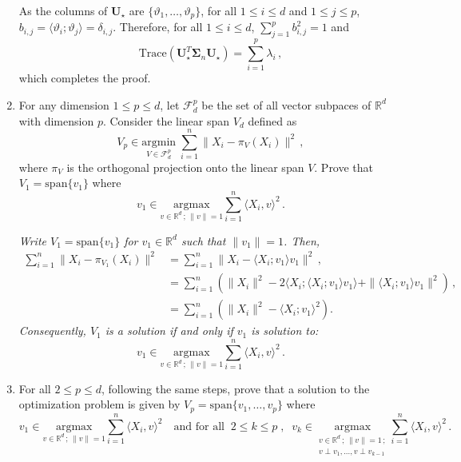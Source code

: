\documentclass[a4paper,10pt,fleqn]{article}
\newcommand{\eqsp}{\,}
\newcommand{\calF}{\mathcal{F}}
\newcommand{\rset}{\ensuremath{\mathbb{R}}}
\newcommand{\1}{\ensuremath{\mathbbm{1}}}
\newcommand{\bfU}{\mathbf{U}}
\newcommand{\bfs}{\mathbf{\Sigma}}
\begin{document}
\begin{enumerate}
{As the columns of $\bfU_{\star}$ are $\{\vartheta_1,\ldots,\vartheta_p\}$, for all $1\leqslant i\leqslant d$ and $1\leqslant j \leqslant p$, $b_{i,j} = \langle \vartheta_i;\vartheta_j\rangle = \delta_{i,j}$. Therefore,  for all $1\leqslant i\leqslant d$, $\sum_{j=1}^p b^2_{i,j} = 1$ and
$$
\mathrm{Trace}(\bfU^T_{\star}\bfs_n \bfU_{\star}) =\sum_{i = 1}^p \lambda_i\eqsp,
$$
which completes the proof.
}
\item  For any dimension $1\leqslant p \leqslant  d$, let $\calF_d^p$ be the set of all vector subpaces of $\rset^d$ with dimension $p$. Consider the linear span $V_d$ defined as
$$
V_p \in \underset{V\in \calF_d^p}{\mathrm{argmin}} \;\sum_{i=1}^n\|X_i - \pi_V(X_i)\|^2\eqsp,
$$
where $\pi_V$ is the orthogonal projection onto the linear span $V$. Prove that $V_1 = \mathrm{span}\{v_1\}$ where
$$
v_1 \in \underset{v \in \rset^d\,;\, \|v\|=1}{\mathrm{argmax}} \sum_{i=1}^n   \langle X_i, v \rangle^2\eqsp.
$$

\vspace{.2cm}

{\em
Write $V_1 = \mathrm{span}\{v_1\}$ for $v_1\in \rset^d$ such that $\|v_1\| = 1$. Then,
\begin{align*}
\sum_{i=1}^n\|X_i - \pi_{V_1}(X_i)\|^2 & = \sum_{i=1}^n\|X_i -  \langle X_i; v_1 \rangle v_1 \|^2\eqsp,\\
& = \sum_{i=1}^n \left( \|X_i\|^2 - 2 \langle X_i; \langle X_i; v_1 \rangle v_1 \rangle + \| \langle X_i; v_1 \rangle v_1 \|^2 \right)\eqsp,\\
& = \sum_{i=1}^n \left( \|X_i\|^2 -   \langle X_i; v_1 \rangle^2 \right).
\end{align*}
Consequently, $V_1$ is a solution  if and only if $v_1$ is solution to:
$$
v_1 \in \underset{v \in \rset^d\,;\, \|v\|=1}{\mathrm{argmax}} \sum_{i=1}^n   \langle X_i, v \rangle^2\eqsp.
$$
}
\item For all $2\leqslant p \leqslant d$, following the same steps, prove that a solution to the optimization problem is given by $V_p = \mathrm{span}\{v_1, \ldots, v_p\}$ where
\begin{equation}
\label{eq:vecpca}
v_1 \in \underset{v\in \rset^d\,;\,\|v\|=1}{\mathrm{argmax}} \sum_{i=1}^n\langle X_i,v\rangle^2 \quad\mbox{and for all}\;\; 2\leqslant k \leqslant p\;,\;\; v_k \in \underset{\substack{v\in \rset^d\,;\,\|v\|=1\,;\\ v\perp v_1,\ldots,v\perp v_{k-1}}}{\mathrm{argmax}}\sum_{i=1}^n\langle X_i,v\rangle^2\eqsp.
\end{equation}


\end{enumerate}
\end{document}
